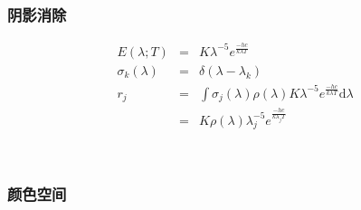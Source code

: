 \documentclass{beamer}
\newcommand{\mathd}{\mathrm{d}}
\newcommand{\nospace}{}
\begin{document}
{{\begin{frame}
  {\hspace{7em}}
\end{frame}}{\begin{frame}
  \frametitle{阴影消除}
  \begin{eqnarray*}
    E (\lambda ; T) & = & K \lambda^{- 5} e^{\frac{- h \nospace c}{k \lambda
    T}}\\
    \sigma_k (\lambda) & = & \delta (\lambda - \lambda_k)\\
    r_j & = & \int \sigma_j (\lambda) \rho (\lambda) K \lambda^{- 5}
    e^{\frac{- h \nospace c}{k \lambda T}} \mathd \lambda\\
    & = & K \rho (\lambda) \lambda_j^{- 5} e^{\frac{- h \nospace c}{k
    \lambda_j T}}
  \end{eqnarray*}
  
  
  \ 
\end{frame}}{\begin{frame}
  \frametitle{颜色空间}
  \begin{eqnarray*}
    &  & 
  \end{eqnarray*}
  

\end{frame}}}
\end{document}

